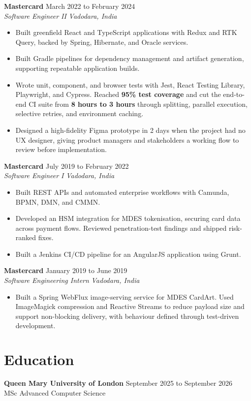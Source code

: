 \documentclass[a4paper,10pt]{article}
\newcommand{\role}[4]{
  \needspace{4\baselineskip}
  \textbf{\color{accent}#1} \hfill {\small #2}\\[-1pt]
  \textit{#3} \hfill {\small\textit{#4}}
}
\begin{document}
\role{Mastercard}{March 2022 to February 2024}{Software Engineer II}{Vadodara, India}
\begin{itemize}
  \item Built greenfield React and TypeScript applications with Redux and RTK Query, backed by Spring, Hibernate, and Oracle services.
  \item Built Gradle pipelines for dependency management and artifact generation, supporting repeatable application builds.
  \item Wrote unit, component, and browser tests with Jest, React Testing Library, Playwright, and Cypress. Reached \textbf{95\% test coverage} and cut the end-to-end CI suite from \textbf{8 hours to 3 hours} through splitting, parallel execution, selective retries, and environment caching.
  \item Designed a high-fidelity Figma prototype in 2 days when the project had no UX designer, giving product managers and stakeholders a working flow to review before implementation.
\end{itemize}

\role{Mastercard}{July 2019 to February 2022}{Software Engineer I}{Vadodara, India}
\begin{itemize}
  \item Built REST APIs and automated enterprise workflows with Camunda, BPMN, DMN, and CMMN.
  \item Developed an HSM integration for MDES tokenisation, securing card data across payment flows. Reviewed penetration-test findings and shipped risk-ranked fixes.
  \item Built a Jenkins CI/CD pipeline for an AngularJS application using Grunt.
\end{itemize}

\role{Mastercard}{January 2019 to June 2019}{Software Engineering Intern}{Vadodara, India}
\begin{itemize}
  \item Built a Spring WebFlux image-serving service for MDES CardArt. Used ImageMagick compression and Reactive Streams to reduce payload size and support non-blocking delivery, with behaviour defined through test-driven development.
\end{itemize}

\section{Education}
\textbf{\color{accent}Queen Mary University of London} \hfill September 2025 to September 2026\\[-1pt]
MSc Advanced Computer Science
\end{document}
